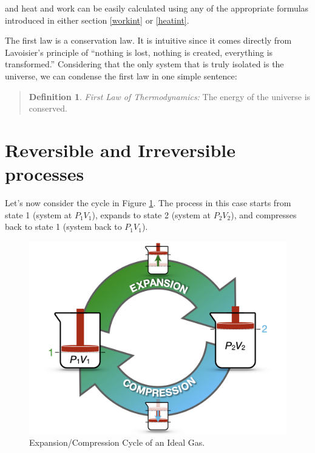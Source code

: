 \documentclass[
  9pt,
]{extbook}
\theoremstyle{definition}
\newtheorem{definition}{Definition}[chapter]
\theoremstyle{definition}
\theoremstyle{definition}
\theoremstyle{definition}
\theoremstyle{remark}
\begin{document}
and heat and work can be easily calculated using any of the appropriate formulas introduced in either section \ref{workint} or \ref{heatint}.

The first law is a conservation law. It is intuitive since it comes directly from Lavoisier's principle of ``nothing is lost, nothing is created, everything is transformed.'' Considering that the only system that is truly isolated is the universe, we can condense the first law in one simple sentence:

\begin{quote}
\begin{definition}
\protect\hypertarget{def:firstlaw}{}\label{def:firstlaw}\emph{First Law of Thermodynamics:} The energy of the universe is conserved.
\end{definition}
\end{quote}

\section{Reversible and Irreversible processes}\label{reversible-and-irreversible-processes}

Let's now consider the cycle in Figure \ref{fig:FigRevCyc}. The process in this case starts from state 1 (system at \(P_1V_1\)), expands to state 2 (system at \(P_2V_2\)), and compresses back to state 1 (system back to \(P_1V_1\)).

\begin{figure}

{\centering \includegraphics[width=0.8\linewidth]{./img/OEP_Figures.005} 

}

\caption{Expansion/Compression Cycle of an Ideal Gas.}\label{fig:FigRevCyc}
\end{figure}
\end{document}
